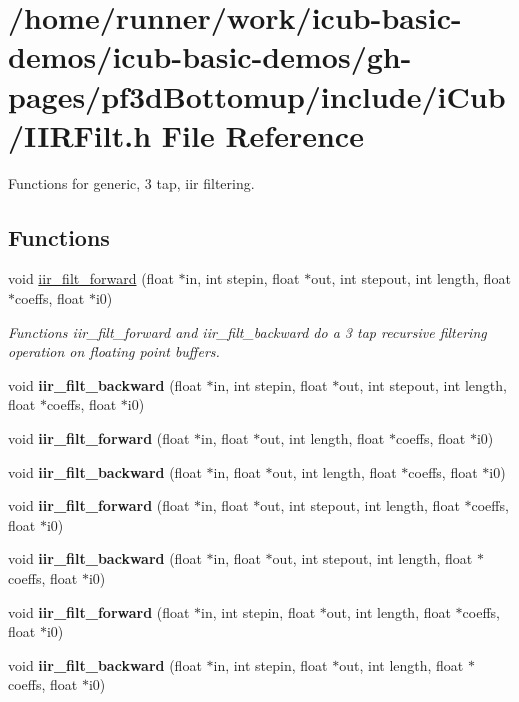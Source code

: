 \section{/home/runner/work/icub-\/basic-\/demos/icub-\/basic-\/demos/gh-\/pages/pf3d\+Bottomup/include/i\+Cub/\+I\+I\+R\+Filt.h File Reference}
\label{IIRFilt_8h}


Functions for generic, 3 tap, iir filtering.  


\subsection*{Functions}
\begin{DoxyCompactItemize}
\item 
void \hyperlink{IIRFilt_8h_a43b5832facfac4984b38e11e2fa80b48}{iir\+\_\+filt\+\_\+forward} (float $\ast$in, int stepin, float $\ast$out, int stepout, int length, float $\ast$coeffs, float $\ast$i0)
\begin{DoxyCompactList}\small\item\em Functions iir\+\_\+filt\+\_\+forward and iir\+\_\+filt\+\_\+backward do a 3 tap recursive filtering operation on floating point buffers. \end{DoxyCompactList}\item 
\mbox{\label{IIRFilt_8h_a43e9e9f0360bfee13e2651311a95390f}} 
void {\bfseries iir\+\_\+filt\+\_\+backward} (float $\ast$in, int stepin, float $\ast$out, int stepout, int length, float $\ast$coeffs, float $\ast$i0)
\item 
\mbox{\label{IIRFilt_8h_a10ff4d91b53ed479cc9eabd72b0399ca}} 
void {\bfseries iir\+\_\+filt\+\_\+forward} (float $\ast$in, float $\ast$out, int length, float $\ast$coeffs, float $\ast$i0)
\item 
\mbox{\label{IIRFilt_8h_aad0f69ef34717b6f4c4dc5bd4ec53fce}} 
void {\bfseries iir\+\_\+filt\+\_\+backward} (float $\ast$in, float $\ast$out, int length, float $\ast$coeffs, float $\ast$i0)
\item 
\mbox{\label{IIRFilt_8h_a09014ca85db071904c4a15fbe2410633}} 
void {\bfseries iir\+\_\+filt\+\_\+forward} (float $\ast$in, float $\ast$out, int stepout, int length, float $\ast$coeffs, float $\ast$i0)
\item 
\mbox{\label{IIRFilt_8h_ada56d2d76b95a4274d14ae620b60a381}} 
void {\bfseries iir\+\_\+filt\+\_\+backward} (float $\ast$in, float $\ast$out, int stepout, int length, float $\ast$coeffs, float $\ast$i0)
\item 
\mbox{\label{IIRFilt_8h_a8363f3ebd3b1b38111c8b4fc2bf3c3d7}} 
void {\bfseries iir\+\_\+filt\+\_\+forward} (float $\ast$in, int stepin, float $\ast$out, int length, float $\ast$coeffs, float $\ast$i0)
\item 
\mbox{\label{IIRFilt_8h_abf2616f9930b7d91f28f0c6323e5f972}} 
void {\bfseries iir\+\_\+filt\+\_\+backward} (float $\ast$in, int stepin, float $\ast$out, int length, float $\ast$coeffs, float $\ast$i0)
\end{DoxyCompactItemize}


